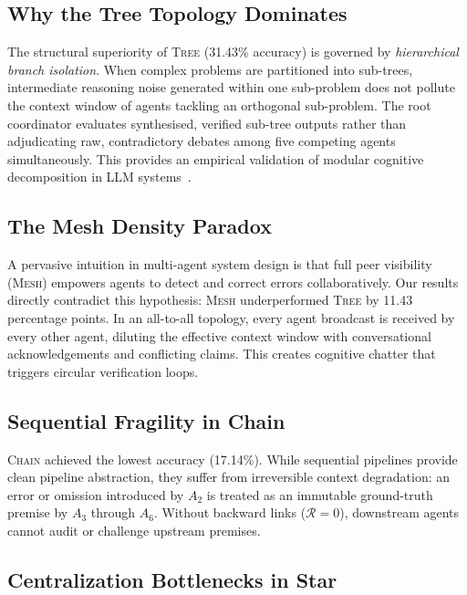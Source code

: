 \documentclass[conference]{IEEEtran}
\newcommand{\RCP}{\mathcal{R}}       %
\newcommand{\topo}[1]{\textsc{#1}}  %
\begin{document}
\subsection{Why the Tree Topology Dominates}

The structural superiority of \topo{Tree} (31.43\% accuracy) is governed by \emph{hierarchical branch isolation}. When complex problems are partitioned into sub-trees, intermediate reasoning noise generated within one sub-problem does not pollute the context window of agents tackling an orthogonal sub-problem. The root coordinator evaluates synthesised, verified sub-tree outputs rather than adjudicating raw, contradictory debates among five competing agents simultaneously. This provides an empirical validation of modular cognitive decomposition in LLM systems~\cite{parnas1972decomposition}.

\subsection{The Mesh Density Paradox}

A pervasive intuition in multi-agent system design is that full peer visibility (\topo{Mesh}) empowers agents to detect and correct errors collaboratively. Our results directly contradict this hypothesis: \topo{Mesh} underperformed \topo{Tree} by 11.43 percentage points. In an all-to-all topology, every agent broadcast is received by every other agent, diluting the effective context window with conversational acknowledgements and conflicting claims. This creates cognitive chatter that triggers circular verification loops.

\subsection{Sequential Fragility in Chain}

\topo{Chain} achieved the lowest accuracy (17.14\%). While sequential pipelines provide clean pipeline abstraction, they suffer from irreversible context degradation: an error or omission introduced by $A_2$ is treated as an immutable ground-truth premise by $A_3$ through $A_6$. Without backward links ($\RCP = 0$), downstream agents cannot audit or challenge upstream premises.

\subsection{Centralization Bottlenecks in Star}
\end{document}
